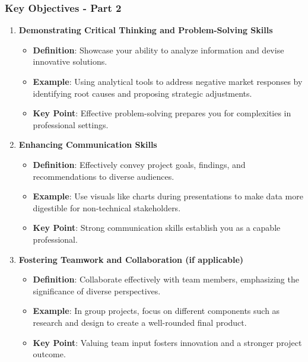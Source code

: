 \documentclass{beamer}
\begin{document}
\begin{frame}[fragile]
    \frametitle{Key Objectives - Part 2}
    \begin{enumerate}[resume]
        \item \textbf{Demonstrating Critical Thinking and Problem-Solving Skills}
            \begin{itemize}
                \item \textbf{Definition}: Showcase your ability to analyze information and devise innovative solutions.
                \item \textbf{Example}: Using analytical tools to address negative market responses by identifying root causes and proposing strategic adjustments.
                \item \textbf{Key Point}: Effective problem-solving prepares you for complexities in professional settings.
            \end{itemize}
        
        \item \textbf{Enhancing Communication Skills}
            \begin{itemize}
                \item \textbf{Definition}: Effectively convey project goals, findings, and recommendations to diverse audiences.
                \item \textbf{Example}: Use visuals like charts during presentations to make data more digestible for non-technical stakeholders.
                \item \textbf{Key Point}: Strong communication skills establish you as a capable professional.
            \end{itemize}

        \item \textbf{Fostering Teamwork and Collaboration (if applicable)}
            \begin{itemize}
                \item \textbf{Definition}: Collaborate effectively with team members, emphasizing the significance of diverse perspectives.
                \item \textbf{Example}: In group projects, focus on different components such as research and design to create a well-rounded final product.
                \item \textbf{Key Point}: Valuing team input fosters innovation and a stronger project outcome.
            \end{itemize}
    \end{enumerate}
\end{frame}
\end{document}

